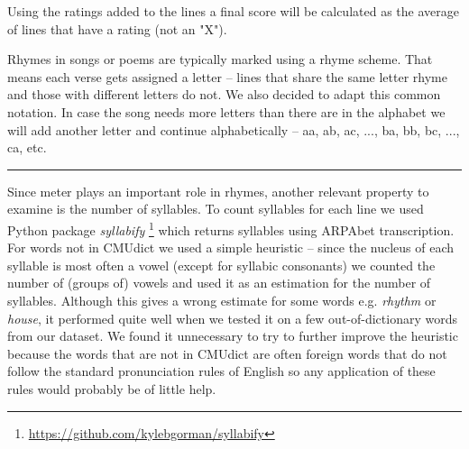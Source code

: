 Using the ratings added to the lines a final score will be calculated as the average of lines that have a rating (not an "X").


 Rhymes in songs or poems are typically marked using a rhyme scheme. That means each verse gets assigned a letter -- lines that share the same letter rhyme and those with different letters do not. We also decided to adapt this common notation. In case the song needs more letters than there are in the alphabet we will add another letter and continue alphabetically -- aa, ab, ac, ..., ba, bb, bc, ..., ca, etc.


	
\noindent\rule{14cm}{0.4pt}

Since meter plays an important role in rhymes, another relevant property to examine is the number of syllables. To count syllables for each line we used Python package \textit{syllabify} \footnote{\url{https://github.com/kylebgorman/syllabify}} which returns syllables using ARPAbet transcription. For words not in CMUdict we used a simple heuristic -- since the nucleus of each syllable is most often a vowel (except for syllabic consonants) we counted the number of (groups of) vowels and used it as an estimation for the number of syllables. Although this gives a wrong estimate for some words e.g. \textit{rhythm} or \textit{house}, it performed quite well when we tested it on a few out-of-dictionary words from our dataset. We found it unnecessary to try to further improve the heuristic because the words that are not in CMUdict are often foreign words that do not follow the standard pronunciation rules of English so any application of these rules would probably be of little help.

